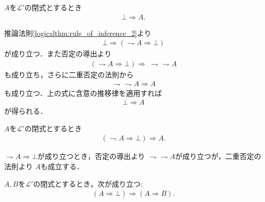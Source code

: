 	\begin{screen}
		\begin{logicalthm}[矛盾からはあらゆる式が導かれる]\label{logicalthm:contradiction_derives_any_formula}
			$A$を$\mathcal{L}'$の閉式とするとき
			\begin{align}
				\bot \Longrightarrow A.
			\end{align}
		\end{logicalthm}
	\end{screen}
	
	\begin{prf}
		推論法則\ref{logicalthm:rule_of_inference_2}より
		\begin{align}
			\bot \Longrightarrow (\rightharpoondown A \Longrightarrow \bot)
		\end{align}
		が成り立つ．また否定の導出より
		\begin{align}
			(\rightharpoondown A \Longrightarrow \bot) \Longrightarrow\ \rightharpoondown \rightharpoondown A
		\end{align}
		も成り立ち，さらに二重否定の法則から
		\begin{align}
			\rightharpoondown \rightharpoondown A \Longrightarrow A
		\end{align}
		も成り立つ．上の式に含意の推移律を適用すれば
		\begin{align}
			\bot \Longrightarrow A
		\end{align}
		が得られる．
		\QED
	\end{prf}
	
	\begin{screen}
		\begin{logicalthm}[背理法の原理]
			$A$を$\mathcal{L}'$の閉式とするとき
			\begin{align}
				(\rightharpoondown A \Longrightarrow \bot) \Longrightarrow A.
			\end{align}
		\end{logicalthm}
	\end{screen}
	
	\begin{prf}
		$\rightharpoondown A \Longrightarrow \bot$が成り立つとき，否定の導出より
		$\rightharpoondown \rightharpoondown A$が成り立つが，二重否定の法則より
		$A$も成立する．
		\QED
	\end{prf}
	
	\begin{screen}
		\begin{logicalthm}[矛盾を導く式はあらゆる式を導く]\label{logicalthm:formula_leading_to_contradiction_derives_any_formula}
			$A,B$を$\mathcal{L}'$の閉式とするとき，次が成り立つ:
			\begin{align}
				(A \Longrightarrow \bot) \Longrightarrow (A \Longrightarrow B).
			\end{align}
		\end{logicalthm}
	\end{screen}
	
